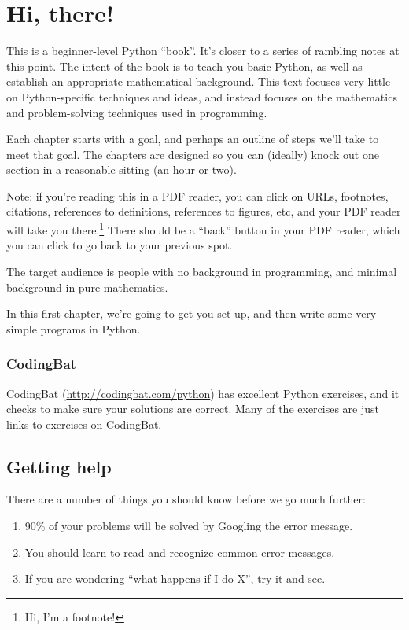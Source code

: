 \chapter{Hi, there!}

This is a beginner-level Python ``book''. It's closer to a series of
rambling notes at this point. The intent of the book is to teach you
basic Python, as well as establish an appropriate mathematical
background. This text focuses very little on Python-specific
techniques and ideas, and instead focuses on the mathematics and
problem-solving techniques used in programming.

Each chapter starts with a goal, and perhaps an outline of steps we'll
take to meet that goal. The chapters are designed so you can (ideally)
knock out one section in a reasonable sitting (an hour or two).

Note: if you're reading this in a PDF reader, you can click on
URLs, footnotes, citations, references to definitions, references to
figures, etc, and your PDF reader will take you there.\footnote{Hi,
  I'm a footnote!} There should be a ``back'' button in your PDF
reader, which you can click to go back to your previous spot.

The target audience is people with no background in programming, and
minimal background in pure mathematics.

In this first chapter, we're going to get you set up, and then write
some very simple programs in Python.

\subsection{CodingBat}

CodingBat (\url{http://codingbat.com/python}) has excellent Python
exercises, and it checks to make sure your solutions are correct. Many
of the exercises are just links to exercises on CodingBat.

\section{Getting help}

There are a number of things you should know before we go much
further:

\begin{enumerate}
\item 90\% of your problems will be solved by Googling the error
  message.
\item You should learn to read and recognize common error messages.
\item If you are wondering ``what happens if I do X'', try it and see.
\end{enumerate}

